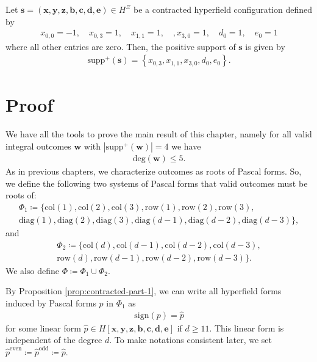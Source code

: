 \begin{example}
    Let \( \mathbf{s} = (\mathbf{x}, \mathbf{y}, \mathbf{z}, \mathbf{b}, \mathbf{c}, \mathbf{d}, \mathbf{e}) \in H^{\Xi}\) be a contracted hyperfield configuration defined by 
    \begin{align*}
        x_{0,0} = -1, \quad x_{0,3} = 1, \quad x_{1,1} = 1, \quad, x_{3,0} = 1, \quad d_0 = 1, \quad e_0 = 1
    \end{align*}
    where all other entries are zero. Then, the positive support of \( \mathbf{s} \) is given by
    \begin{align*}
        \mathrm{supp}^+(\mathbf{s}) = \left\{ x_{0,3}, x_{1,1}, x_{3,0}, d_0, e_0 \right\}.
    \end{align*}
\end{example}

\section{Proof}

We have all the tools to prove the main result of this chapter, namely for all valid integral outcomes \( \mathbf w \) with \( |\mathrm{supp}^+(\mathbf w)| = 4 \) we have
\begin{align*}
    \mathrm{deg}(\mathbf w) \leq 5.
\end{align*}
As in previous chapters, we characterize outcomes as roots of Pascal forms. So, we define the following two systems of Pascal forms that valid outcomes must be roots of:
\begin{gather*}
    \Phi_1 \coloneqq \{ 
        \mathrm{col}(1), \mathrm{col}(2), \mathrm{col}(3), \mathrm{row}(1), \mathrm{row}(2), \mathrm{row}(3),\\
         \mathrm{diag}(1), \mathrm{diag}(2), \mathrm{diag}(3), \mathrm{diag}(d-1), \mathrm{diag}(d-2), \mathrm{diag}(d-3) 
     \},
\end{gather*}
and 
\begin{gather*}
    \Phi_2 \coloneqq \{ 
        \mathrm{col}(d), \mathrm{col}(d-1), \mathrm{col}(d-2), \mathrm{col}(d-3), \\
        \mathrm{row}(d), \mathrm{row}(d-1), \mathrm{row}(d-2), \mathrm{row}(d-3) 
     \}.
\end{gather*}
We also define \( \Phi \coloneqq \Phi_1 \cup \Phi_2 \).

By Proposition \ref{prop:contracted-part-1}, we can write all hyperfield forms induced by Pascal forms \( p \) in \( \Phi_1 \) as 
\begin{align*}
    \mathrm{sign}(p) = \hat p
\end{align*}
for some linear form \( \hat p \in H[\mathbf{x}, \mathbf{y}, \mathbf{z}, \mathbf{b}, \mathbf{c}, \mathbf{d}, \mathbf{e}] \) if \( d \geq 11 \). This linear form is independent of the degree \( d \). To make notations consistent later, we set \( \hat p^{\mathrm{even}} \coloneqq  \hat p^{\mathrm{odd}}  \coloneqq \hat p\).

